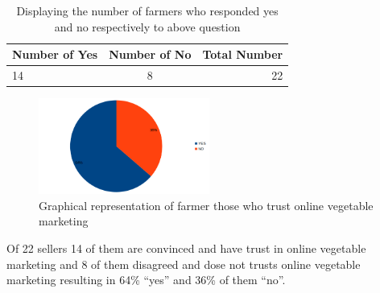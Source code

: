 \documentclass[12pt]{report}
\begin{document}
\begin{normalsize}
\begin{table}[h]
		\centering
		\begin{tabular}{ | l | c | r | } \hline
		\textbf{Number of Yes} & \textbf{Number of No} & \textbf{Total Number} \\ \hline			
		14 & 8 & 22 \\ \hline
		\end{tabular}
		\caption{Displaying the number of farmers who responded yes and no respectively to above question}
		\label{5.0}
	    \end{table}
\begin{figure}[h]       %
	\centering
	\includegraphics[width=0.5\textwidth]{farmer 3.png} 
	\caption{ Graphical representation of farmer those who trust online vegetable marketing  }
	\label{myLabel}		%
	\end{figure}
\newpage
Of 22 sellers 14 of them are convinced and have trust in online vegetable marketing and 8 of them disagreed and dose not trusts online vegetable marketing resulting in 64\% “yes” and 36\% of them “no”.\newline\\[0.1cm]


\end{normalsize}
\end{document}
